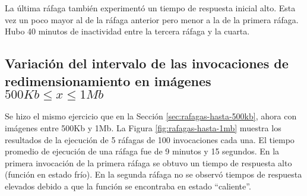 La última ráfaga también experimentó un tiempo de respuesta inicial alto. Esta vez un poco mayor al de la ráfaga anterior pero menor a la de la primera ráfaga. Hubo 40 minutos de inactividad entre la tercera ráfaga y la cuarta. 

\subsection{Variación del intervalo de las invocaciones de redimensionamiento en imágenes $500Kb \leq x \leq 1Mb$}

Se hizo el mismo ejercicio que en la Sección \ref{sec:rafagas-hasta-500kb}, ahora con imágenes entre 500Kb y 1Mb. La Figura \ref{fig:rafagas-hasta-1mb} muestra los resultados de la ejecución de 5 ráfagas de 100 invocaciones cada una. El tiempo promedio de ejecución de una ráfaga fue de 9 minutos y 15 segundos. En la primera invocación de la primera ráfaga se obtuvo un tiempo de respuesta alto (función en estado frío). En la segunda ráfaga no se observó tiempos de respuesta elevados debido a que la función se encontraba en estado ``caliente''. 

